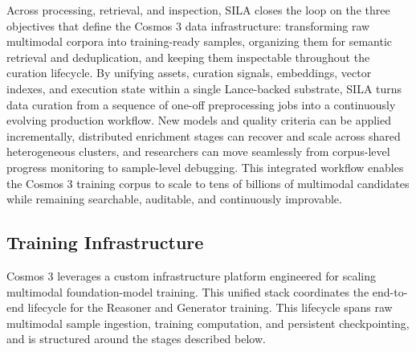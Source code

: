 \documentclass{llmxive}
\begin{document}
Across processing, retrieval, and inspection, SILA closes the loop on the three objectives that define the Cosmos 3 data infrastructure: transforming raw multimodal corpora into training-ready samples, organizing them for semantic retrieval and deduplication, and keeping them inspectable throughout the curation lifecycle. By unifying assets, curation signals, embeddings, vector indexes, and execution state within a single Lance-backed substrate, SILA turns data curation from a sequence of one-off preprocessing jobs into a continuously evolving production workflow. New models and quality criteria can be applied incrementally, distributed enrichment stages can recover and scale across shared heterogeneous clusters, and researchers can move seamlessly from corpus-level progress monitoring to sample-level debugging. This integrated workflow enables the Cosmos 3 training corpus to scale to tens of billions of multimodal candidates while remaining searchable, auditable, and continuously improvable.

\subsection{Training Infrastructure}
\label{subsec::training_infrastructure}

Cosmos 3 leverages a custom infrastructure platform engineered for scaling multimodal foundation-model training. This unified stack coordinates the end-to-end lifecycle for the Reasoner and Generator training. This lifecycle spans raw multimodal sample ingestion, training computation, and persistent checkpointing, and is structured around the stages described below.
\end{document}
